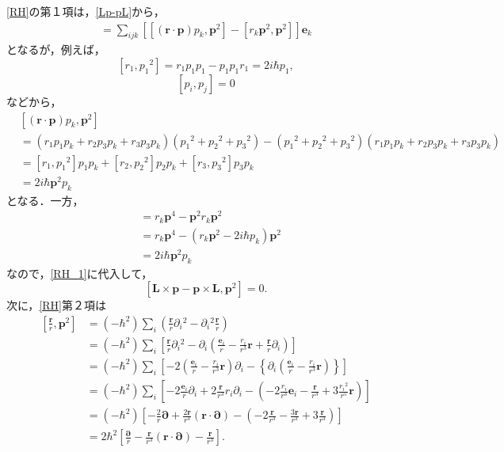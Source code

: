 \eqref{RH}の第１項は，\eqref{Lp-pL}から，
\begin{align}
  [\boldsymbol{L}\times\boldsymbol{p} - \boldsymbol{p}\times\boldsymbol{L},\boldsymbol{p}^2] = \sum_{ijk}\left[[(\boldsymbol{r}\cdot\boldsymbol{p})p_k,\boldsymbol{p}^2] - [r_k\boldsymbol{p}^2,\boldsymbol{p}^2]\right]\boldsymbol{e}_k\label{RH_1}
\end{align}
となるが，例えば，
\[[r_1,p_1{}^2]=r_1p_1p_1 - p_1p_1r_1=2i\hbar p_1,\]
\[[p_i,p_j]=0\]
などから，
\begin{align*}
  & [(\boldsymbol{r}\cdot\boldsymbol{p})p_k,\boldsymbol{p}^2] \\
  & = (r_1p_1p_k + r_2p_3p_k + r_3p_3p_k)(p_1{}^2 + p_2{}^2 + p_3{}^2) - (p_1{}^2 + p_2{}^2 + p_3{}^2)(r_1p_1p_k + r_2p_3p_k + r_3p_3p_k)\\
  & = [r_1,p_1{}^2]p_1p_k + [r_2,p_2{}^2]p_2p_k + [r_3,p_3{}^2]p_3p_k\\
  & = 2i\hbar\boldsymbol{p}^2p_k
\end{align*}
となる．一方，
\begin{align*}
  [r_k\boldsymbol{p}^2,\boldsymbol{p}^2]
  & = r_k\boldsymbol{p}^4 - \boldsymbol{p}^2r_k\boldsymbol{p}^2\\
  & = r_k\boldsymbol{p}^4 - (r_k\boldsymbol{p}^2 - 2i\hbar p_k)\boldsymbol{p}^2\\
  & = 2i\hbar\boldsymbol{p}^2p_k
\end{align*}
なので，\eqref{RH_1}に代入して，
\[[\boldsymbol{L}\times\boldsymbol{p} - \boldsymbol{p}\times\boldsymbol{L},\boldsymbol{p}^2]=0.\]
次に，\eqref{RH}第２項は
\begin{align*}
  \left[\frac{\boldsymbol{r}}{r},\boldsymbol{p}^2\right]
  & = ( - \hbar^2)\sum_i\left(\frac{\boldsymbol{r}}{r}\partial_i{}^2 - \partial_i{}^2\frac{\boldsymbol{r}}{r}\right)\\
  & = ( - \hbar^2)\sum_i\left[\frac{\boldsymbol{r}}{r}\partial_i{}^2 - \partial_i\left(\frac{\boldsymbol{e}_i}{r} - \frac{r_i}{r^3}\boldsymbol{r} + \frac{\boldsymbol{r}}{r}\partial_i\right)\right]\\
  & = ( - \hbar^2)\sum_i\left[ - 2\left(\frac{\boldsymbol{e}_i}{r} - \frac{r_i}{r^3}\boldsymbol{r}\right)\partial_i - \left\{\partial_i\left(\frac{\boldsymbol{e}_i}{r} - \frac{r_i}{r^3}\boldsymbol{r}\right)\right\}\right]\\
  & = ( - \hbar^2)\sum_i\left[ - 2\frac{\boldsymbol{e}_i}{r}\partial_i + 2\frac{\boldsymbol{r}}{r^3}r_i\partial_i - \left( - 2\frac{r_i}{r^3}\boldsymbol{e}_i - \frac{\boldsymbol{r}}{r^3} + 3\frac{r_i{}^2}{r^5}\boldsymbol{r}\right)\right]\\
  & = ( - \hbar^2)\left[ - \frac{2}{r}\boldsymbol{\partial} + \frac{2\boldsymbol{r}}{r^3}(\boldsymbol{r}\cdot\boldsymbol{\partial}) - \left( - 2\frac{\boldsymbol{r}}{r^3} - \frac{3\boldsymbol{r}}{r^3} + 3\frac{\boldsymbol{r}}{r^3}\right)\right]\\
  & = 2\hbar^2\left[\frac{\boldsymbol{\partial}}{r} - \frac{\boldsymbol{r}}{r^3}(\boldsymbol{r}\cdot\boldsymbol{\partial}) - \frac{\boldsymbol{r}}{r^3}\right].
\end{align*}
